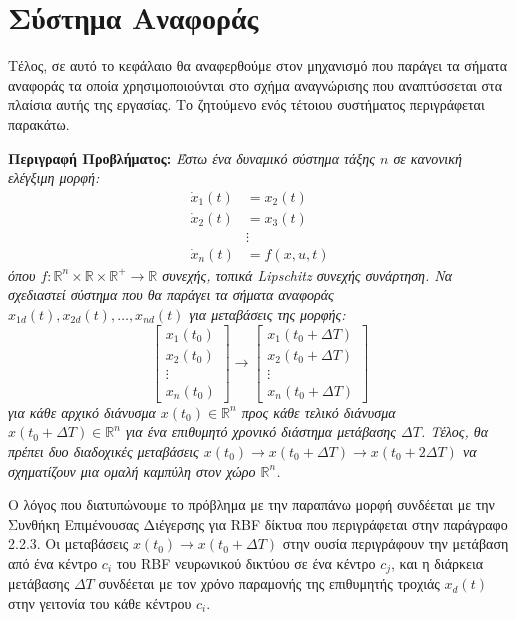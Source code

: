 \section{Σύστημα Αναφοράς} \label{sec:ref_system}
Τέλος, σε αυτό το κεφάλαιο θα αναφερθούμε στον μηχανισμό που παράγει τα σήματα αναφοράς τα οποία χρησιμοποιούνται στο σχήμα αναγνώρισης που αναπτύσσεται στα πλαίσια αυτής της εργασίας. Το ζητούμενο ενός τέτοιου συστήματος περιγράφεται παρακάτω.

\textbf{Περιγραφή Προβλήματος:} 
\textit{Έστω ένα δυναμικό σύστημα τάξης $n$ σε κανονική ελέγξιμη μορφή:
\begin{equation}
\begin{split}
\dot{x}_1(t) &= x_2(t) \\
\dot{x}_2(t) &= x_3(t) \\
&\vdots \\
\dot{x}_n(t) &= f(x,u,t)
\end{split}
\label{eq:canonical_system}
\end{equation}
όπου $f:\mathbb{R}^n \times \mathbb{R}\times \mathbb{R}^+ \rightarrow \mathbb{R}$ συνεχής, τοπικά Lipschitz συνεχής συνάρτηση. Να σχεδιαστεί σύστημα που θα παράγει τα σήματα αναφοράς $x_{1d}(t), x_{2d}(t), \dots, x_{nd}(t)$ για μεταβάσεις της μορφής:
\begin{equation}
	\begin{bmatrix}
		x_1(t_0) \\ x_2(t_0) \\ \vdots \\ x_n(t_0)
	\end{bmatrix}
	\rightarrow
	\begin{bmatrix}
	 x_1(t_0+ \Delta T) \\ x_2(t_0+ \Delta T) \\ \vdots \\ x_n(t_0+ \Delta T)
	\end{bmatrix}
	\label{eq:ref_transition}
\end{equation}
για κάθε αρχικό διάνυσμα $x(t_0) \in  \mathbb{R}^n$ προς κάθε τελικό διάνυσμα $x(t_0+\Delta T) \in  \mathbb{R}^n$ για ένα επιθυμητό χρονικό διάστημα μετάβασης $\Delta T$. Τέλος, θα πρέπει δυο διαδοχικές μεταβάσεις 
$x(t_0) \rightarrow x(t_0+ \Delta T) \rightarrow x(t_0+ 2\Delta T)$ να σχηματίζουν μια ομαλή καμπύλη στον χώρο $\mathbb{R}^n$.
}

Ο λόγος που διατυπώνουμε το πρόβλημα με την παραπάνω μορφή συνδέεται με την Συνθήκη Επιμένουσας Διέγερσης για RBF δίκτυα που περιγράφεται στην παράγραφο 2.2.3. Οι μεταβάσεις $x(t_0) \rightarrow x(t_0+ \Delta T)$ στην ουσία περιγράφουν την μετάβαση από ένα κέντρο $c_i$ του RBF νευρωνικού δικτύου σε ένα κέντρο $c_j$, και η διάρκεια μετάβασης $\Delta T$ συνδέεται με τον χρόνο παραμονής της επιθυμητής τροχιάς $x_d(t)$ στην γειτονία του κάθε κέντρου $c_i$.

